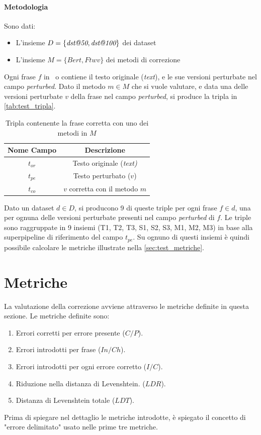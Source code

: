 \paragraph{Metodologia} Sono dati:
\begin{itemize}
\item L'insieme $D = \{\textit{dst@50}, \textit{dst@100} \}$ dei dataset
\item L'insieme $M = \{\textit{Bert}, \textit{Ftwv}\}$ dei metodi di correzione
\end{itemize}
Ogni frase $f$ in \dsta\ o \dstb contiene il testo originale (\textit{text}), e le sue versioni perturbate nel campo \textit{perturbed}. Dato il metodo $m \in M$ che si vuole valutare, e data una delle versioni perturbate $v$ della frase nel campo \textit{perturbed}, si produce la tripla in \autoref{tab:test_tripla}.

\begin{table}[H]
\centering
\begin{tabular}{cc}
\textbf{Nome Campo} & \textbf{Descrizione} \\
\hline
$t_{or}$ & Testo originale (\textit{text)}\\
$t_{pe}$ & Testo perturbato ($v$)\\
$t_{co}$ & $v$ corretta con il metodo $m$
\end{tabular}
\caption{Tripla contenente la frase corretta con uno dei metodi in $M$}
\label{tab:test_tripla}
\end{table}
\noindent
Dato un dataset $d \in D$, si producono 9 di queste triple per ogni frase $f \in d$, una per ognuna delle versioni perturbate presenti nel campo \textit{perturbed} di  $f$. Le triple sono raggruppate in 9 insiemi (T1, T2, T3, S1, S2, S3, M1, M2, M3) in base alla superpipeline di riferimento del campo $t_{pe}$. Su ognuno di questi insiemi è quindi possibile calcolare le metriche illustrate nella \autoref{sec:test_metriche}.

\section{Metriche}
\label{sec:test_metriche}
La valutazione della correzione avviene attraverso le metriche definite in questa sezione. Le metriche definite sono:
\begin{enumerate}
\item Errori corretti per errore presente ($C/P$).
\item Errori introdotti per frase ($In/Ch$).
\item Errori introdotti per ogni errore corretto ($I/C$).
\item Riduzione nella distanza di Levenshtein. ($LDR$).
\item Distanza di Levenshtein totale ($LDT$).
\end{enumerate}
\noindent
Prima di spiegare nel dettaglio le metriche introdotte, è spiegato il concetto di "errore delimitato" usato nelle prime tre metriche.

